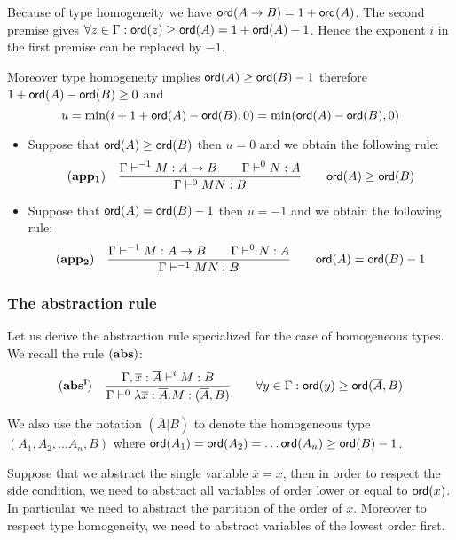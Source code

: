 Because of type homogeneity we have ${\sf ord}(A\rightarrow B ) = 1 +
{\sf ord}(A)$. The second premise gives $\forall z \in \Gamma : {\sf ord}(z)
\geq {\sf ord}(A) = 1 + {\sf ord}(A) - 1$. Hence the exponent $i$ in the first
premise can be replaced by $-1$.


Moreover type homogeneity implies ${\sf ord}(A) \geq {\sf ord}(B)-1$ therefore
$1 + {\sf ord}(A) - {\sf ord}(B) \geq 0$ and
$$ u = \min(i+1 + {\sf ord}(A) - {\sf ord}(B),0) = \min({\sf ord}(A) - {\sf ord}(B),0)$$

\begin{itemize}
\item Suppose that ${\sf ord}(A) \geq {\sf ord}(B)$ then $u=0$ and we obtain the following rule:
$$ \mathbf{(app_1)} \quad  \frac{\displaystyle \Gamma \vdash^{-1} M : A\rightarrow B
                                        \qquad \Gamma \vdash^{0} N : A }{\Gamma  \vdash^{0} M N : B}
                                    \qquad {\sf ord}(A) \geq {\sf ord}(B)$$

\item Suppose that ${\sf ord}(A) = {\sf ord}(B) - 1$ then
$ u = -1$ and we obtain the following rule:
$$ \mathbf{(app_2)} \quad  \frac{\displaystyle \Gamma \vdash^{-1} M : A\rightarrow B
                                        \qquad \Gamma \vdash^{0} N : A
                                   }{\Gamma  \vdash^{-1} M N : B}
                                    \qquad {\sf ord}(A) = {\sf ord}(B) - 1$$
\end{itemize}



\subsubsection{The abstraction rule}

Let us derive the abstraction rule specialized for the case of
homogeneous types. We recall the rule $\mathbf{(abs)}$:
$$ \mathbf{(abs^i)} \quad  \frac{\displaystyle \Gamma, \overline{x} : \overline{A} \vdash^{i} M : B}{\Gamma  \vdash^{0} \lambda \overline{x} : \overline{A} . M : (\overline{A},B)} \qquad
                                   \forall y \in \Gamma : {\sf ord}(y) \geq {\sf ord}(\overline{A},B)$$

We also use the notation $(\overline{A}|B)$ to denote the
homogeneous type $(A_1, A_2, \ldots A_n, B)$ where ${\sf ord}(A_1) =
{\sf ord}(A_2) =  \ldots {\sf ord}(A_n) \geq {\sf ord}(B) -1$.


Suppose that we abstract the single variable $\overline{x} = x$,
then in order to respect the side condition, we need to abstract all
variables of order lower or equal to ${\sf ord}(x)$. In particular we
need to abstract the partition of the order of $x$. Moreover to
respect type homogeneity, we need to abstract variables of the
lowest order first.

